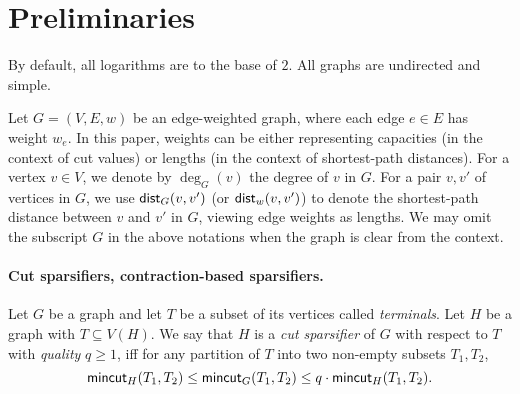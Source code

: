 \section{Preliminaries}
\label{sec: prelim}

By default, all logarithms are to the base of $2$. 
All graphs are undirected and simple.

Let $G=(V,E,w)$ be an edge-weighted graph, where each edge $e\in E$ has weight $w_e$. 
In this paper, weights can be either representing capacities (in the context of cut values) or lengths (in the context of shortest-path distances).
For a vertex $v\in V$, we denote by $\deg_G(v)$ the degree of $v$ in $G$.
For a pair $v,v'$ of vertices in $G$, we use $\textnormal{\textsf{dist}}_{G}(v,v')$ (or $\textnormal{\textsf{dist}}_{w}(v,v')$) to denote the shortest-path distance between $v$ and $v'$ in $G$, viewing edge weights as lengths.
We may omit the subscript $G$ in the above notations when the graph is clear from the context.


\iffalse
\paragraph{Chernoff Bound.}
We will use the following form of Chernoff bound (see e.g.\cite{dubhashi2009concentration}).
\begin{lemma}[Chernoff Bound] \label{prop:chernoff}
	Let $X_1,\dots X_n$ be independent random variables taking values in $\{0,1\}$. Let $X$ denote their sum and let $\mu=\ex{X}$ denote the sum's expected value. Then for any $\delta>0$, 
	$$
	\pr{X > (1+\delta) \mu} < \left( \frac{e^{\delta}}{(1+\delta)^{1+\delta}}\right)^{\mu}.
	$$
\end{lemma}
\fi



\paragraph{Cut sparsifiers, contraction-based sparsifiers.}
Let $G$ be a graph and let $T$ be a subset of its vertices called \emph{terminals}. 
%
Let $H$ be a graph with $T\subseteq V(H)$. We say that $H$ is a \emph{cut sparsifier} of $G$ with respect to $T$ with \emph{quality} $q\ge 1$, iff for any partition of $T$ into two non-empty subsets $T_1,T_2$, 
\[\mathsf{mincut}_H(T_1,T_2)\le \mathsf{mincut}_G(T_1,T_2)\le q\cdot\mathsf{mincut}_H(T_1,T_2).\]



